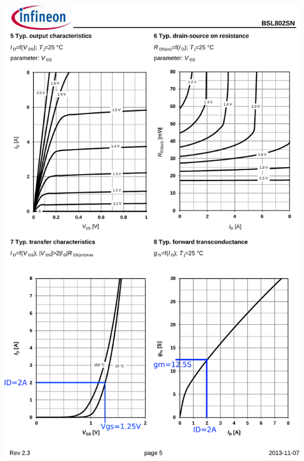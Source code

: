 \documentclass{../../template/tp}
\begin{document}
\begin{center}
{\includegraphics[width=15cm]{Infineon-BSL802SN-DS-v01_00-en_corr.pdf}}
{\vspace{-1cm}
}
\end{center}
\end{document}
